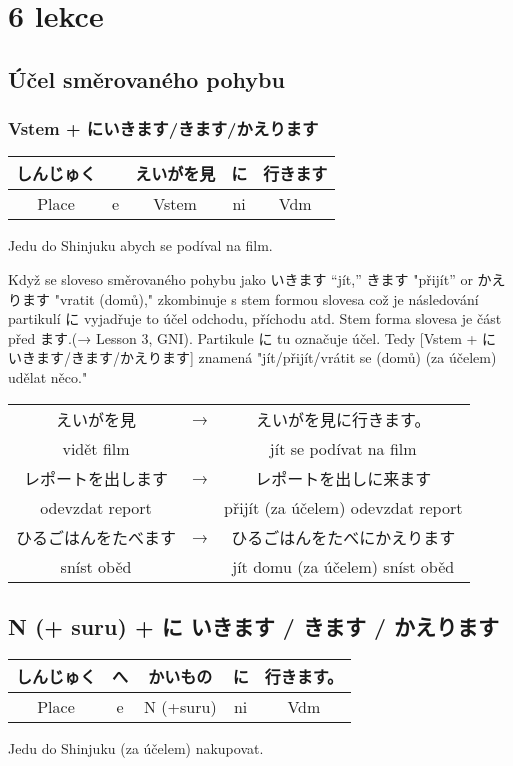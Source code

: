 \section{6 lekce}
\label{sec:lekce_6}
\subsection{  Účel směrovaného pohybu}
\subsubsection{ Vstem + にいきます/きます/かえります}
\begin{center}
\begin{tabular}{||c|c||c|c||c||}
\hline
しんじゅく&& えいがを見&に&行きます\\
\hline
Place&e&Vstem&ni&Vdm\\ 
\hline
\end{tabular}
\end{center}
Jedu do Shinjuku abych se podíval na film.

Když se sloveso směrovaného pohybu jako  いきます “jít,” きます "přijít” or かえります
"vratit (domů)," zkombinuje s stem formou slovesa což je následování partikulí に  vyjadřuje to účel odchodu, příchodu atd. Stem forma slovesa je část před ます.(→ Lesson 3, GNI). Partikule  に tu označuje účel. Tedy [Vstem + に いきます/きます/かえります] znamená "jít/přijít/vrátit se (domů) (za účelem) udělat něco."

\begin{center}
\begin{tabular}{ccc}
えいがを見 &→& えいがを見に行きます。\\
vidět film&& jít se podívat na film\\
レポートを出します&→&レポートを出しに来ます\\
 odevzdat report &&přijít (za účelem) odevzdat report\\
ひるごはんをたべます &→& ひるごはんをたべにかえります\\
sníst oběd &&jít domu (za účelem) sníst oběd\\
\end{tabular}
\end{center}

\subsection{ N (+ suru) + に いきます / きます / かえります}
\begin{center}
\begin{tabular}{||c|c||c|c||c||}
\hline
しんじゅく &へ& かいもの &に& 行きます。\\
\hline
Place&e&N (+suru)&ni&Vdm\\
\hline
\end{tabular}
\end{center}
Jedu do Shinjuku (za účelem) nakupovat.



